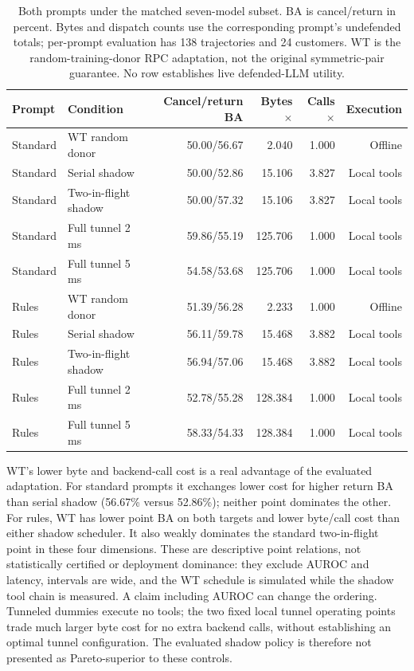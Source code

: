 \begin{table}[ht]\centering\footnotesize
\caption{Both prompts under the matched seven-model subset. BA is cancel/return in percent. Bytes and dispatch counts use the corresponding prompt's undefended totals; per-prompt evaluation has 138 trajectories and 24 customers. WT is the random-training-donor RPC adaptation, not the original symmetric-pair guarantee. No row establishes live defended-LLM utility.}\label{tab:r8-matched-seven}
\begin{tabular}{@{}llrrrr@{}}\toprule
Prompt & Condition & Cancel/return BA & Bytes$\times$ & Calls$\times$ & Execution\\\midrule
Standard & WT random donor & 50.00/56.67 & 2.040 & 1.000 & Offline\\
Standard & Serial shadow & 50.00/52.86 & 15.106 & 3.827 & Local tools\\
Standard & Two-in-flight shadow & 50.00/57.32 & 15.106 & 3.827 & Local tools\\
Standard & Full tunnel 2 ms & 59.86/55.19 & 125.706 & 1.000 & Local tools\\
Standard & Full tunnel 5 ms & 54.58/53.68 & 125.706 & 1.000 & Local tools\\
Rules & WT random donor & 51.39/56.28 & 2.233 & 1.000 & Offline\\
Rules & Serial shadow & 56.11/59.78 & 15.468 & 3.882 & Local tools\\
Rules & Two-in-flight shadow & 56.94/57.06 & 15.468 & 3.882 & Local tools\\
Rules & Full tunnel 2 ms & 52.78/55.28 & 128.384 & 1.000 & Local tools\\
Rules & Full tunnel 5 ms & 58.33/54.33 & 128.384 & 1.000 & Local tools\\
\bottomrule\end{tabular}\end{table}

WT's lower byte and backend-call cost is a real advantage of the evaluated adaptation. For standard prompts it exchanges lower cost for higher return BA than serial shadow (56.67\% versus 52.86\%); neither point dominates the other. For rules, WT has lower point BA on both targets and lower byte/call cost than either shadow scheduler. It also weakly dominates the standard two-in-flight point in these four dimensions. These are descriptive point relations, not statistically certified or deployment dominance: they exclude AUROC and latency, intervals are wide, and the WT schedule is simulated while the shadow tool chain is measured. A claim including AUROC can change the ordering. Tunneled dummies execute no tools; the two fixed local tunnel operating points trade much larger byte cost for no extra backend calls, without establishing an optimal tunnel configuration. The evaluated shadow policy is therefore not presented as Pareto-superior to these controls.

